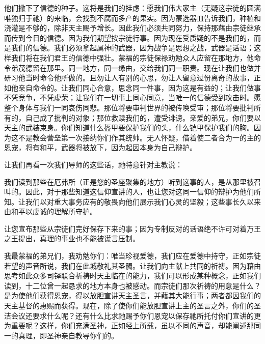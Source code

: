 他们撒下了信德的种子。这将是我们的挂虑：愿我们伟大家主（无疑这宗徒的圆满唯独归于祂）的来临，会找到不腐而多产的果实。因为蒙选器皿告诉我们，种植和浇灌是不够的，除非天主赐予增长。因此我们必须共同努力，保持那藉由宗徒继承而传到今日的信德。因为我们期望按宗徒行事。因为现在受质疑的不是我们的，而是我们的信德。我们必须拿起属神的武器，因为战争是思想之战，武器是话语；这样我们将在我们君王的信德中强壮。蒙福的宗徒保禄劝勉众人应留在那地方，他命令弟茂德留在那里。同一地方，同一缘由，交给我们同一职责。现在让我们也做并研习他当时命令他所做的。且勿让人有别的心思，勿让人留意过份离奇的故事，正如他亲自命令的。让我们同心合意，思念同一件事，因为这是有益的；让我们做事不凭竞争，不凭虚荣；让我们在一切事上同心同意，当唯一的信德受到攻击时。愿整个身体与我们一同哀伤同悲。那位将要审判世界的被传唤受审；那位将要批判所有的，自己成了批判的对象；那位救赎我们的，遭受诽谤。亲爱的弟兄，你们要以天主的武装束身。你们知道什么盔甲要保护我们的头，什么铠甲保护我们的胸。因为这不是教会营垒第一次接纳你们作其统帅。无人怀疑，借着使二者合为一的主的恩宠，将有和平，武器将被放下，因为起因本身为自己辩护。\par

让我们再看一次我们导师的这些话，祂特意针对主教说：\par

我们读到那些在厄弗所（正是您的圣座聚集的地方）听到这事的人，是从那里被召叫的。因此，对于那些知道这信仰宣讲的人，也让您对这同一信仰的辩护为他们所知。让我们以对重大事务应有的敬畏向他们展示我们心灵的坚毅；这些事长久以来由和平以虔诚的理解所守护。\par

让您宣布那些从宗徒们完好保存下来的事；因为专制反对的话语绝不许可对着万王之王提出，真理的事业也不能被谎言压制。\par

我最蒙福的弟兄们，我劝勉你们：唯当珍视爱德，我们应在爱德中持守，正如宗徒若望的声音所说，我们在此城敬礼其圣髑。让我们向主献上共同的祈祷。因为藉由思考如此众多司铎联合祈祷时天主临在的能力，我们可以形成某种概念，正如我们读到，十二位曾一起恳求的地方本身也被感动。而宗徒们那次祈祷的用意是什么？是为使他们获得恩宠，得以放胆宣讲天主圣言，并藉其大能行事；两者都因我们的天主基督的惠赐而获得。现在，除了使你们能放胆宣讲上主的圣言之外，你们的圣洁会议还要求什么呢？还有什么比求祂赐予你们恩宠以保存祂所托付你们宣讲的更为重要呢？这样，你们充满圣神，正如经上所载，虽以不同的声音，却能阐述那同一的真理，即圣神亲自教导你们的。\par

